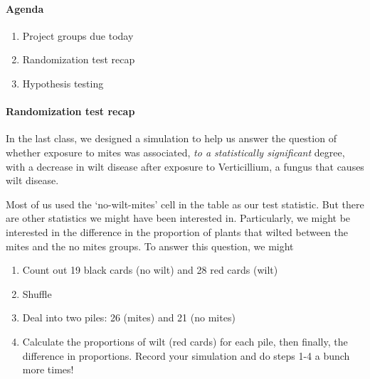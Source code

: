 \documentclass[10pt]{article}\usepackage[]{graphicx}\usepackage[]{color}
\begin{document}
\paragraph{Agenda}
\begin{enumerate}
  \itemsep0em
  \item Project groups due today
  \item Randomization test recap
  \item Hypothesis testing
\end{enumerate}



\paragraph{Randomization test recap}

In the last class, we designed a simulation to help us answer the question of whether exposure to mites was associated, \emph{to a statistically significant} degree, with a decrease in wilt disease after exposure to Verticillium, a fungus that causes wilt disease. 

Most of us used the `no-wilt-mites' cell in the table as our test statistic. But there are other statistics we might have been interested in. Particularly, we might be interested in the difference in the proportion of plants that wilted between the mites and the no mites groups. To answer this question, we might
\begin{enumerate}
\item Count out 19 black cards (no wilt) and 28 red cards (wilt)
\item Shuffle
\item Deal into two piles: 26 (mites) and 21 (no mites)
\item Calculate the proportions of wilt (red cards) for each pile, then finally, the difference in proportions. Record your simulation and do steps 1-4 a bunch more times!
\end{enumerate}
\end{document}
